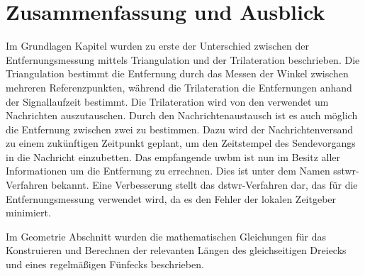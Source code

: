 %
%	
%	
%
\chapter{Zusammenfassung und Ausblick}

Im Grundlagen Kapitel wurden zu erste der Unterschied zwischen der Entfernungsmessung mittels Triangulation und der Trilateration beschrieben. Die Triangulation bestimmt die Entfernung durch das Messen der Winkel zwischen mehreren Referenzpunkten, während die Trilateration die Entfernungen anhand der Signallaufzeit bestimmt. Die Trilateration wird von den  verwendet um Nachrichten auszutauschen. Durch den Nachrichtenaustausch ist es auch möglich die Entfernung zwischen zwei  zu bestimmen. Dazu wird der Nachrichtenversand zu einem zukünftigen Zeitpunkt geplant, um den Zeitstempel des Sendevorgangs in die Nachricht einzubetten. Das empfangende \gls{uwbm} ist nun im Besitz aller Informationen um die Entfernung zu errechnen. Dies ist unter dem Namen \gls{sstwr}-Verfahren bekannt. Eine Verbesserung stellt das \gls{dstwr}-Verfahren dar, das für die Entfernungsmessung verwendet wird, da es den Fehler der lokalen Zeitgeber minimiert.

Im Geometrie Abschnitt wurden die mathematischen Gleichungen für das Konstruieren und Berechnen der relevanten Längen des gleichseitigen Dreiecks und eines regelmäßigen Fünfecks beschrieben.

